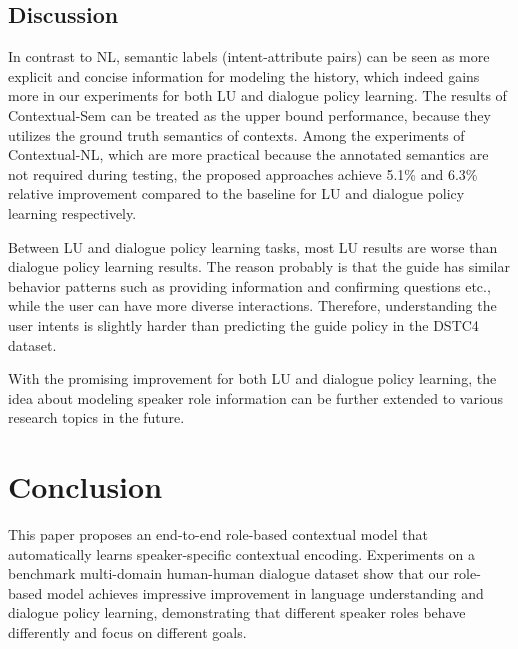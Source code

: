 \documentclass[11pt,letterpaper]{article}
\begin{document}
\subsection{Discussion}
In contrast to NL, semantic labels (intent-attribute pairs) can be seen as more explicit and concise information for modeling the history, which indeed gains more in our experiments for both LU and dialogue policy learning.
The results of Contextual-Sem can be treated as the upper bound performance, because they utilizes the ground truth semantics of contexts.
Among the experiments of Contextual-NL, which are more practical because the annotated semantics are not required during testing, the proposed approaches achieve 5.1\% and 6.3\% relative improvement compared to the baseline for LU and dialogue policy learning respectively.

Between LU and dialogue policy learning tasks, most LU results are worse than dialogue policy learning results.
The reason probably is that the guide has similar behavior patterns such as providing information and confirming questions etc., while the user can have more diverse interactions.
Therefore, understanding the user intents is slightly harder than predicting the guide policy in the DSTC4 dataset.

With the promising improvement for both LU and dialogue policy learning, the idea about modeling speaker role information can be further extended to various research topics in the future.

\section{Conclusion}
This paper proposes an end-to-end role-based contextual model that automatically learns speaker-specific contextual encoding.
Experiments on a benchmark multi-domain human-human dialogue dataset show that our role-based model achieves impressive improvement in language understanding and dialogue policy learning, demonstrating that different speaker roles behave differently and focus on different goals.
\end{document}
